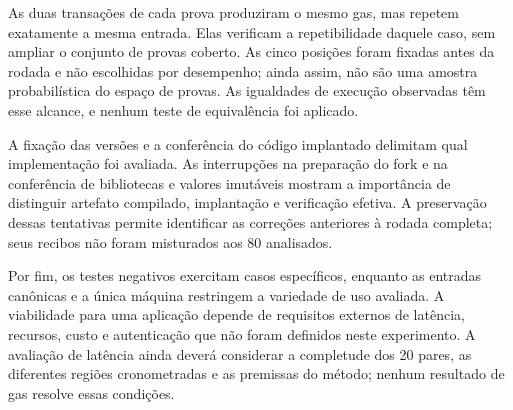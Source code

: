 As duas transações de cada prova produziram o mesmo gas, mas repetem exatamente a mesma entrada. Elas verificam a repetibilidade daquele caso, sem ampliar o conjunto de provas coberto. As cinco posições foram fixadas antes da rodada e não escolhidas por desempenho; ainda assim, não são uma amostra probabilística do espaço de provas. As igualdades de execução observadas têm esse alcance, e nenhum teste de equivalência foi aplicado.

A fixação das versões e a conferência do código implantado delimitam qual implementação foi avaliada. As interrupções na preparação do fork e na conferência de bibliotecas e valores imutáveis mostram a importância de distinguir artefato compilado, implantação e verificação efetiva. A preservação dessas tentativas permite identificar as correções anteriores à rodada completa; seus recibos não foram misturados aos 80 analisados.

Por fim, os testes negativos exercitam casos específicos, enquanto as entradas canônicas e a única máquina restringem a variedade de uso avaliada. A viabilidade para uma aplicação depende de requisitos externos de latência, recursos, custo e autenticação que não foram definidos neste experimento. A avaliação de latência ainda deverá considerar a completude dos 20 pares, as diferentes regiões cronometradas e as premissas do método; nenhum resultado de gas resolve essas condições.
